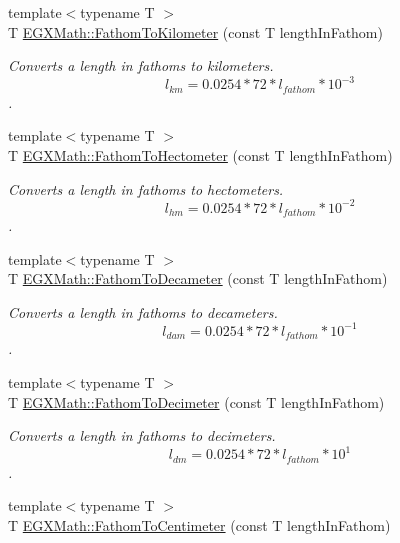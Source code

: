 \begin{DoxyCompactItemize}
{\footnotesize template$<$typename T $>$ }\\T \mbox{\hyperlink{group___e_g_x_math-_conversions-_length_conversions-_nautical-_fathom-_s_i_gaa94789483238000a82b01720546e84d7}{E\+G\+X\+Math\+::\+Fathom\+To\+Kilometer}} (const T length\+In\+Fathom)
\begin{DoxyCompactList}\small\item\em Converts a length in fathoms to kilometers. \[ l_{km}=0.0254 * 72 * l_{fathom} * 10^{-3} \]. \end{DoxyCompactList}\item 
{\footnotesize template$<$typename T $>$ }\\T \mbox{\hyperlink{group___e_g_x_math-_conversions-_length_conversions-_nautical-_fathom-_s_i_ga2667f0d80cdd5d547a9a5bc0f1220768}{E\+G\+X\+Math\+::\+Fathom\+To\+Hectometer}} (const T length\+In\+Fathom)
\begin{DoxyCompactList}\small\item\em Converts a length in fathoms to hectometers. \[ l_{hm}=0.0254 * 72 * l_{fathom} * 10^{-2} \]. \end{DoxyCompactList}\item 
{\footnotesize template$<$typename T $>$ }\\T \mbox{\hyperlink{group___e_g_x_math-_conversions-_length_conversions-_nautical-_fathom-_s_i_ga58364998b467b74922de64f4e2f92825}{E\+G\+X\+Math\+::\+Fathom\+To\+Decameter}} (const T length\+In\+Fathom)
\begin{DoxyCompactList}\small\item\em Converts a length in fathoms to decameters. \[ l_{dam}=0.0254 * 72 * l_{fathom} * 10^{-1} \]. \end{DoxyCompactList}\item 
{\footnotesize template$<$typename T $>$ }\\T \mbox{\hyperlink{group___e_g_x_math-_conversions-_length_conversions-_nautical-_fathom-_s_i_gaceb060a2b2455c407eacabd842fa4b59}{E\+G\+X\+Math\+::\+Fathom\+To\+Decimeter}} (const T length\+In\+Fathom)
\begin{DoxyCompactList}\small\item\em Converts a length in fathoms to decimeters. \[ l_{dm}=0.0254 * 72 * l_{fathom} * 10^{1} \]. \end{DoxyCompactList}\item 
{\footnotesize template$<$typename T $>$ }\\T \mbox{\hyperlink{group___e_g_x_math-_conversions-_length_conversions-_nautical-_fathom-_s_i_ga3995ded9e8a94c2d7059dd148954b46c}{E\+G\+X\+Math\+::\+Fathom\+To\+Centimeter}} (const T length\+In\+Fathom)

\end{DoxyCompactItemize}
